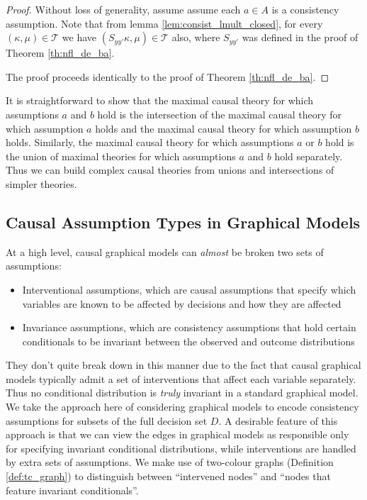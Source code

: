 \begin{proof}
Without loss of generality, assume assume each $a\in A$ is a consistency assumption. Note that from lemma \ref{lem:consist_lmult_closed}, for every $(\kappa,\mu)\in \mathscr{T}$ we have $(S_{yy'}\kappa,\mu)\in \mathscr{T}$ also, where $S_{yy'}$ was defined in the proof of Theorem \ref{th:nfl_de_ba}.

The proof proceeds identically to the proof of Theorem \ref{th:nfl_de_ba}.
\end{proof}

It is straightforward to show that the maximal causal theory for which assumptions $a$ and $b$ hold is the intersection of the maximal causal theory for which assumption $a$ holds and the maximal causal theory for which assumption $b$ holds. Similarly, the maximal causal theory for which assumptions $a$ or $b$ hold is the union of maximal theories for which assumptions $a$ and $b$ hold separately. Thus we can build complex causal theories from unions and intersections of simpler theories.

\subsection{Causal Assumption Types in Graphical Models}

At a high level, causal graphical models can \emph{almost} be broken two sets of assumptions:
\begin{itemize}
    \item Interventional assumptions, which are causal assumptions that specify which variables are known to be affected by decisions and how they are affected
    \item Invariance assumptions, which are consistency assumptions that hold certain conditionals to be invariant between the observed and outcome distributions
\end{itemize}

They don't quite break down in this manner due to the fact that causal graphical models typically admit a set of interventions that affect each variable separately. Thus no conditional distribution is \emph{truly} invariant in a standard graphical model. We take the approach here of considering graphical models to encode consistency assumptions for subsets of the full decision set $D$. A desirable feature of this approach is that we can view the edges in graphical models as responsible only for specifying invariant conditional distributions, while interventions are handled by extra sets of assumptions. We make use of two-colour graphs (Definition \ref{def:tc_graph}) to distinguish between ``intervened nodes'' and ``nodes that feature invariant conditionals''.

